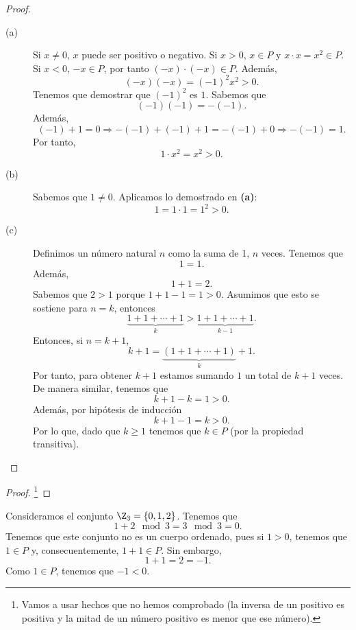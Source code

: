 \begin{proof}
\begin{description}
\item[(a)] Si $\displaystyle x \neq 0 $, $\displaystyle x $ puede ser positivo o negativo. Si $\displaystyle x>0 $, $\displaystyle x \in P $ y $\displaystyle x \cdot x = x^{2} \in P $. Si $\displaystyle x<0 $, $\displaystyle -x \in P $, por tanto $\displaystyle \left(-x\right) \cdot \left(- x\right)\in P $. Además, 
	\[\left(-x\right)\left(-x\right) = \left(-1\right)^{2}x^{2}>0 .\]
Tenemos que demostrar que $\displaystyle \left(-1\right)^{2} $ es $\displaystyle 1 $. Sabemos que
\[\left(-1\right)\left(-1\right) = -\left(-1\right) .\]
Además, 
\[\left(-1\right) + 1 = 0 \Rightarrow -\left(-1\right)+\left(-1\right)+1 = -\left(-1\right)+0 \Rightarrow -\left(-1\right) = 1 .\]
Por tanto, 
\[1 \cdot x^{2} = x^{2} > 0 .\]

\item[(b)] Sabemos que $\displaystyle 1 \neq 0 $. Aplicamos lo demostrado en \textbf{(a)}:
	\[1 = 1 \cdot 1 = 1^{2} >0 .\]
\item[(c)] Definimos un número natural $\displaystyle n $ como la suma de 1, $\displaystyle n $ veces. Tenemos que 
	\[1 = 1 .\]
Además, 
\[1 + 1 = 2 .\]
Sabemos que $\displaystyle 2>1 $ porque $\displaystyle 1+1-1 = 1 > 0 $. Asumimos que esto se sostiene para $\displaystyle n = k $, entonces
\[\underbrace{1+1+\cdots+1}_{k}>\underbrace{1 + 1 + \cdots + 1}_{k-1} .\]
Entonces, si $\displaystyle n = k+1 $, 
\[k + 1 = \underbrace{\left(1 + 1+ \cdots + 1\right)}_{k} + 1 .\]
Por tanto, para obtener $\displaystyle k+1 $ estamos sumando $\displaystyle 1 $ un total de $\displaystyle k+ 1 $ veces. De manera similar, tenemos que 
\[k + 1 - k = 1 > 0.\]
Además, por hipótesis de inducción
\[k+1-1 = k > 0 .\]
Por lo que, dado que $\displaystyle k \geq 1 $ tenemos que $\displaystyle k \in P $ (por la propiedad transitiva). 
\end{description}
\end{proof}

\begin{proof}
\footnote{Vamos a usar hechos que no hemos comprobado (la inversa de un positivo es positiva y la mitad de un número positivo es menor que ese número). 
}\end{proof}

\begin{eg}
	\normalfont Consideramos el conjunto $\displaystyle \Z_{3} =  \left\{ 0, 1, 2\right\}  $. Tenemos que 
	\[1 + 2 \mod 3 = 3 \mod 3 = 0 .\]
Tenemos que este conjunto no es un cuerpo ordenado, pues si $\displaystyle 1 > 0 $, tenemos que $\displaystyle 1 \in P $ y, consecuentemente, $\displaystyle 1 + 1 \in P $. Sin embargo, 
\[1 + 1 = 2 = -1 .\]
Como $\displaystyle 1 \in P $, tenemos que $\displaystyle -1 <0 $. 
\end{eg}

